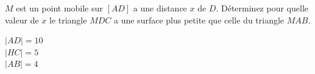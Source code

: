 %
%
    \(M\) est un point mobile sur \([AD]\) a une distance \(x\) de \(D\). Déterminez pour quelle valeur de \(x\) le triangle \(MDC\) a une surface plus petite que celle du triangle \(MAB\).

    \parbox{3cm}{%
        \(\lvert AD \rvert=10\)\\
        \(\lvert HC \rvert=5\)\\
        \(\lvert AB \rvert=4\)%
    }
    \hfil
